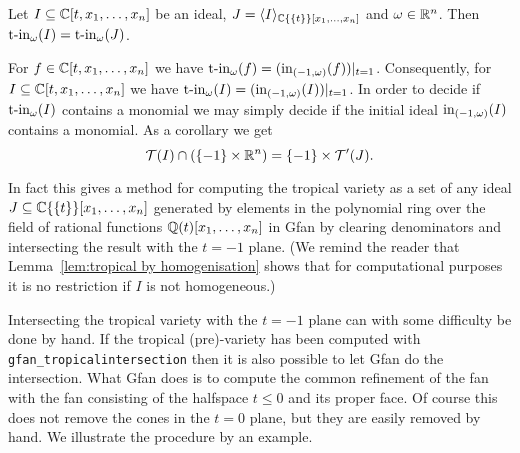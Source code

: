 \begin{proposition} \cite[Proposition~7.3]{lifting}
\label{prop:computing tinit}
Let $I\subseteq \mathbb{C}[t,x_1,\dots,x_n]$ be an ideal, $J=\langle I\rangle_{{\mathbb{C}\{\{t\}\} }[x_1,\dots,x_n]}$ and $\omega\in\mathbb{R}^n$. Then $\textup{t-in}_\omega(I)=\textup{t-in}_\omega(J)$.
\end{proposition}

\begin{remark}
\label{rem:computing tinit}
For $f\in\mathbb{C}[t,x_1,\dots,x_n]$ we have
$\textup{t-in}_\omega(f)=(\textup{in}_{(-1,\omega)}(f))|_{t=1}$. Consequently, for
$I\subseteq\mathbb{C}[t,x_1,\dots,x_n]$ we have
$\textup{t-in}_\omega(I)=(\textup{in}_{(-1,\omega)}(I))|_{t=1}$. In order to
decide if $\textup{t-in}_\omega(I)$ contains a monomial we may simply decide if the initial ideal
$\textup{in}_{(-1,\omega)}(I)$ contains a monomial.
 As a corollary we get
$$ \mathcal{T} (I)\cap(\{-1\}\times\mathbb{R}^n)=\{-1\}\times \mathcal{T} '(J).$$

In fact this gives a method for computing the tropical variety as a set of any
ideal $J\subseteq\mathbb{C}\{\{t\}\}[x_1,\dots,x_n]$ generated by elements
in the polynomial ring over the field of rational functions
$\mathbb{Q}(t)[x_1,\dots,x_n]$ in Gfan by clearing denominators and
intersecting the result with the $t=-1$ plane.  (We remind the reader
that Lemma~\ref{lem:tropical by homogenisation} shows that for
computational purposes it is no restriction if $I$ is not
homogeneous.)
\end{remark}

Intersecting the tropical variety with the $t=-1$ plane can with some difficulty be done by
hand. If the tropical (pre)-variety has been computed with
\texttt{gfan\_tropicalintersection} then it is also possible to let Gfan do
the intersection. What Gfan does is to compute the common refinement
of the fan with the fan consisting of the halfspace $t\leq 0$ and its
proper face. Of course this does not remove the cones in the $t=0$
plane, but they are easily removed by hand. We illustrate the
procedure by an example.

